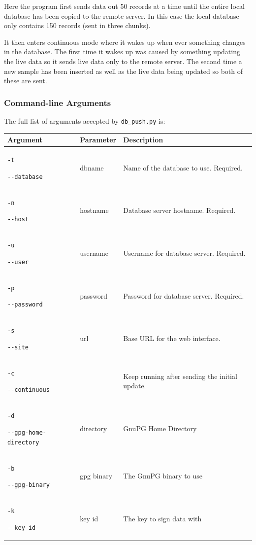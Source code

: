 \documentclass[a4paper,10pt,draft]{book}
\begin{document}
Here the program first sends data out 50 records at a time until the entire local database has been copied to the remote server. In this case the local database only contains 150 records (sent in three chunks).

It then enters continuous mode where it wakes up when ever something changes in the database. The first time it wakes up was caused by something updating the live data so it sends live data only to the remote server. The second time a new sample has been inserted as well as the live data being updated so both of these are sent.

\subsubsection{Command-line Arguments}
The full list of arguments accepted by \verb|db_push.py| is:

\begin{tabular}{p{4.2cm} l p{7.9cm}}
\hline
\textbf{Argument} & \textbf{Parameter} & \textbf{Description} \\
\hline
\verb|-t| \par \verb|--database| & dbname & Name of the database to use. Required. \\
\verb|-n| \par \verb|--host| & hostname & Database server hostname. Required. \\
\verb|-u| \par \verb|--user| & username & Username for database server. Required. \\
\verb|-p| \par \verb|--password| & password & Password for database server. Required. \\

\verb|-s| \par \verb|--site| & url & Base URL for the web interface. \\

\verb|-c| \par \verb|--continuous| & & Keep running after sending the initial update. \\

\verb|-d| \par \verb|--gpg-home-directory| & directory & GnuPG Home Directory \\

\verb|-b| \par \verb|--gpg-binary| & gpg binary & The GnuPG binary to use \\

\verb|-k| \par \verb|--key-id| & key id & The key to sign data with \\
\hline
\end{tabular}
\end{document}
